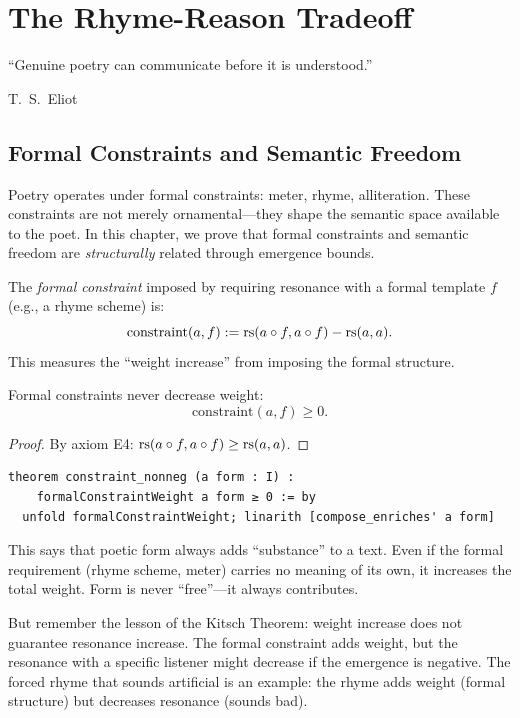 
\chapter{The Rhyme-Reason Tradeoff}
\label{ch:rhyme}

\epigraph{``Genuine poetry can communicate before it is understood.''}{T.\ S.\ Eliot}

\section{Formal Constraints and Semantic Freedom}

Poetry operates under formal constraints: meter, rhyme, alliteration.
These constraints are not merely ornamental---they shape the semantic
space available to the poet.  In this chapter, we prove that formal
constraints and semantic freedom are \emph{structurally} related through
emergence bounds.

\begin{definition}
The \emph{formal constraint} imposed by requiring resonance with a
formal template $f$ (e.g., a rhyme scheme) is:
\[
  \mathrm{constraint}(a, f) := \mathrm{rs}(a \circ f, a \circ f) - \mathrm{rs}(a, a).
\]
This measures the ``weight increase'' from imposing the formal structure.
\end{definition}

\begin{theorem}
\label{thm:constraints-add}
Formal constraints never decrease weight:
\[
  \mathrm{constraint}(a, f) \geq 0.
\]
\end{theorem}

\begin{proof}
By axiom E4: $\mathrm{rs}(a \circ f, a \circ f) \geq \mathrm{rs}(a, a)$.
\end{proof}

\begin{lstlisting}
theorem constraint_nonneg (a form : I) :
    formalConstraintWeight a form ≥ 0 := by
  unfold formalConstraintWeight; linarith [compose_enriches' a form]
\end{lstlisting}

\begin{interpretation}
This says that poetic form always adds ``substance'' to a text.  Even
if the formal requirement (rhyme scheme, meter) carries no meaning of
its own, it increases the total weight.  Form is never ``free''---it
always contributes.

But remember the lesson of the Kitsch Theorem: weight increase does not
guarantee resonance increase.  The formal constraint adds weight, but
the resonance with a specific listener might decrease if the emergence
is negative.  The forced rhyme that sounds artificial is an example:
the rhyme adds weight (formal structure) but decreases resonance
(sounds bad).
\end{interpretation}


